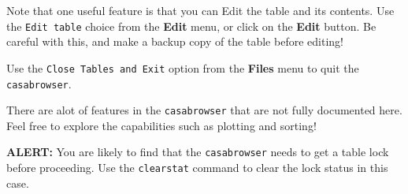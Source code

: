 Note that one useful feature is that you can Edit the table and its
contents.  Use the {\tt Edit table} choice from the {\bf Edit} menu,
or click on the {\bf Edit} button.  Be careful with this, and make
a backup copy of the table before editing!

Use the {\tt Close Tables and Exit} option from the {\bf Files} menu
to quit the {\tt casabrowser}.

There are alot of features in the {\tt casabrowser}
that are not fully documented here.  Feel free to explore the
capabilities such as plotting and sorting!

{\bf ALERT:} You are likely to find that the {\tt casabrowser}
needs to get a table lock before proceeding.  Use the {\tt clearstat}
command to clear the lock status in this case.



%

